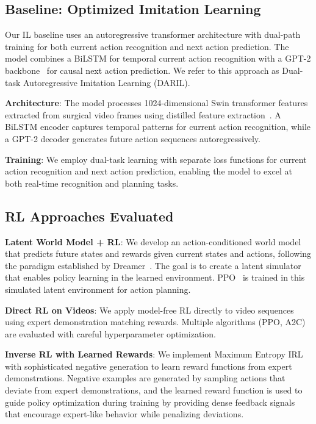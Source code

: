\documentclass[runningheads]{llncs}
\begin{document}
\subsection{Baseline: Optimized Imitation Learning}

Our IL baseline uses an autoregressive transformer architecture with dual-path training for both current action recognition and next action prediction. The model combines a BiLSTM for temporal current action recognition with a GPT-2 backbone~\cite{radford2019language} for causal next action prediction. We refer to this approach as Dual-task Autoregressive Imitation Learning (DARIL).

\textbf{Architecture}: The model processes 1024-dimensional Swin transformer features~\cite{liu2021swin} extracted from surgical video frames using distilled feature extraction~\cite{yamlahi2023self}. A BiLSTM encoder captures temporal patterns for current action recognition, while a GPT-2 decoder generates future action sequences autoregressively.

\textbf{Training}: We employ dual-task learning with separate loss functions for current action recognition and next action prediction, enabling the model to excel at both real-time recognition and planning tasks.

\subsection{RL Approaches Evaluated}

\textbf{Latent World Model + RL}: We develop an action-conditioned world model that predicts future states and rewards given current states and actions, following the paradigm established by Dreamer~\cite{hafner2020dream}. The goal is to create a latent simulator that enables policy learning in the learned environment. PPO~\cite{schulman2017proximal} is trained in this simulated latent environment for action planning.

\textbf{Direct RL on Videos}: We apply model-free RL directly to video sequences using expert demonstration matching rewards. Multiple algorithms (PPO, A2C) are evaluated with careful hyperparameter optimization.

\textbf{Inverse RL with Learned Rewards}: We implement Maximum Entropy IRL~\cite{ziebart2008maximum} with sophisticated negative generation to learn reward functions from expert demonstrations. Negative examples are generated by sampling actions that deviate from expert demonstrations, and the learned reward function is used to guide policy optimization during training by providing dense feedback signals that encourage expert-like behavior while penalizing deviations.
\end{document}
